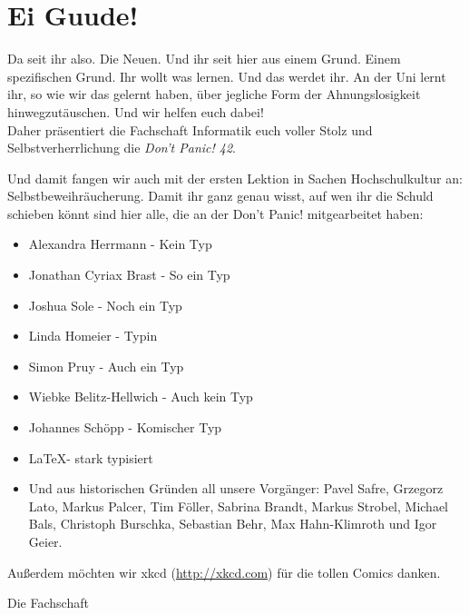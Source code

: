 \section*{Ei Guude!}
Da seit ihr also. Die Neuen. Und ihr seit hier aus einem Grund. Einem spezifischen Grund. Ihr wollt was lernen.
Und das werdet ihr. An der Uni lernt ihr, so wie wir das gelernt haben,
\"uber jegliche Form der Ahnungslosigkeit hinwegzut\"auschen. Und wir helfen euch dabei!\\
Daher pr\"asentiert die Fachschaft Informatik euch voller Stolz und Selbstverherrlichung die \emph{Don't Panic! 42}.

Und damit fangen wir auch mit der ersten Lektion in Sachen Hochschulkultur an: Selbstbeweihr\"aucherung.
Damit ihr ganz genau wisst, auf wen ihr die Schuld schieben k\"onnt sind hier alle, die an der Don't Panic! mitgearbeitet haben:
\begin{itemize}
	\item Alexandra Herrmann - Kein Typ
	\item Jonathan Cyriax Brast - So ein Typ
	\item Joshua Sole - Noch ein Typ
	\item Linda Homeier - Typin
	\item Simon Pruy - Auch ein Typ
	\item Wiebke Belitz-Hellwich - Auch kein Typ
	\item Johannes Schöpp - Komischer Typ
	\item \LaTeX - stark typisiert
	\item Und aus historischen Gr\"unden all unsere Vorg\"anger:
	Pavel Safre, Grzegorz Lato, Markus Palcer, Tim F\"oller, Sabrina Brandt, Markus Strobel, Michael Bals, Christoph Burschka, Sebastian Behr, Max Hahn-Klimroth und Igor Geier.
\end{itemize}
Außerdem möchten wir xkcd (\url{http://xkcd.com}) für die tollen Comics danken.
\begin{flushright}Die Fachschaft\end{flushright}